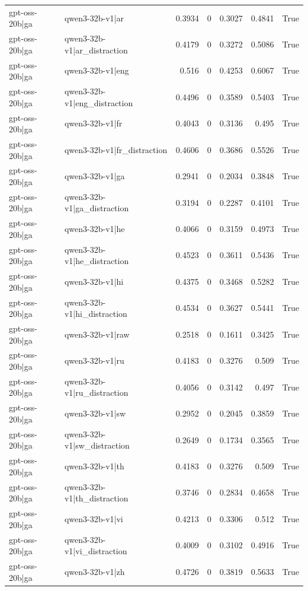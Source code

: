 \begin{table}
\begin{tabular}{l l r r r r l}
gpt-oss-20b|ga & qwen3-32b-v1|ar & 0.3934 & 0 & 0.3027 & 0.4841 & True \\
gpt-oss-20b|ga & qwen3-32b-v1|ar_distraction & 0.4179 & 0 & 0.3272 & 0.5086 & True \\
gpt-oss-20b|ga & qwen3-32b-v1|eng & 0.516 & 0 & 0.4253 & 0.6067 & True \\
gpt-oss-20b|ga & qwen3-32b-v1|eng_distraction & 0.4496 & 0 & 0.3589 & 0.5403 & True \\
gpt-oss-20b|ga & qwen3-32b-v1|fr & 0.4043 & 0 & 0.3136 & 0.495 & True \\
gpt-oss-20b|ga & qwen3-32b-v1|fr_distraction & 0.4606 & 0 & 0.3686 & 0.5526 & True \\
gpt-oss-20b|ga & qwen3-32b-v1|ga & 0.2941 & 0 & 0.2034 & 0.3848 & True \\
gpt-oss-20b|ga & qwen3-32b-v1|ga_distraction & 0.3194 & 0 & 0.2287 & 0.4101 & True \\
gpt-oss-20b|ga & qwen3-32b-v1|he & 0.4066 & 0 & 0.3159 & 0.4973 & True \\
gpt-oss-20b|ga & qwen3-32b-v1|he_distraction & 0.4523 & 0 & 0.3611 & 0.5436 & True \\
gpt-oss-20b|ga & qwen3-32b-v1|hi & 0.4375 & 0 & 0.3468 & 0.5282 & True \\
gpt-oss-20b|ga & qwen3-32b-v1|hi_distraction & 0.4534 & 0 & 0.3627 & 0.5441 & True \\
gpt-oss-20b|ga & qwen3-32b-v1|raw & 0.2518 & 0 & 0.1611 & 0.3425 & True \\
gpt-oss-20b|ga & qwen3-32b-v1|ru & 0.4183 & 0 & 0.3276 & 0.509 & True \\
gpt-oss-20b|ga & qwen3-32b-v1|ru_distraction & 0.4056 & 0 & 0.3142 & 0.497 & True \\
gpt-oss-20b|ga & qwen3-32b-v1|sw & 0.2952 & 0 & 0.2045 & 0.3859 & True \\
gpt-oss-20b|ga & qwen3-32b-v1|sw_distraction & 0.2649 & 0 & 0.1734 & 0.3565 & True \\
gpt-oss-20b|ga & qwen3-32b-v1|th & 0.4183 & 0 & 0.3276 & 0.509 & True \\
gpt-oss-20b|ga & qwen3-32b-v1|th_distraction & 0.3746 & 0 & 0.2834 & 0.4658 & True \\
gpt-oss-20b|ga & qwen3-32b-v1|vi & 0.4213 & 0 & 0.3306 & 0.512 & True \\
gpt-oss-20b|ga & qwen3-32b-v1|vi_distraction & 0.4009 & 0 & 0.3102 & 0.4916 & True \\
gpt-oss-20b|ga & qwen3-32b-v1|zh & 0.4726 & 0 & 0.3819 & 0.5633 & True \\

\end{tabular}
\end{table}
